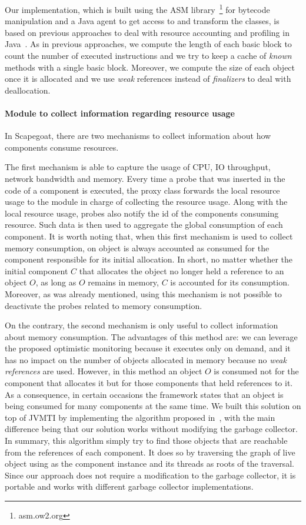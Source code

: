 Our implementation, which is built using the ASM library~\footnote{asm.ow2.org} for bytecode manipulation and a Java agent to get access to and transform the classes, is based on previous approaches to deal with resource accounting and profiling in Java~\cite{binder_portable_2006,Binder200645,czajkowski_jres:_1998}.
As in previous approaches, we compute the length of each basic block to count the number of executed instructions and we try to keep a cache of \textit{known} methods with a single basic block.
Moreover, we compute the size of each object once it is allocated and we use \textit{weak} references instead of \textit{finalizers} to deal with deallocation.

\paragraph{Module to collect information regarding resource usage}
In Scapegoat, there are two mechanisms to collect information about how components consume resources.

The first mechanism is able to capture the usage of CPU, IO throughput, network bandwidth and memory.
Every time a probe that was inserted in the code of a component is executed, the proxy class forwards the local resource usage to the module in charge of collecting the resource usage.
Along with the local resource usage, probes also notify the id of the components consuming resource.
Such data is then used to aggregate the global consumption of each component.
It is worth noting that, when this first mechanism is used to collect memory consumption, on object is always accounted as  consumed for the component responsible for its initial allocation.
In short, no matter whether the initial component $C$ that allocates the object no longer held a reference to an object $O$, as long as $O$ remains in memory, $C$ is accounted for its consumption.
Moreover, as was already mentioned, using this mechanism is not possible to deactivate the probes related to memory consumption.

On the contrary, the second mechanism is only useful to collect information about memory consumption.
The advantages of this method are: we can leverage the proposed optimistic monitoring because it executes only on demand, and it has no impact on the number of objects allocated in memory because no \textit{weak references} are used.
However, in this method an object $O$ is consumed not for the component that allocates it but for those components that held references to it.
As a consequence, in certain occasions the framework states that an object is being consumed for many components at the same time. 
We built this solution on top of JVMTI by implementing the algorithm proposed in~\cite{Price:2003:GCM:829515.830545, dsn/09/geoffray/ijvm}, with the main difference being that our solution works without modifying the garbage collector.
In summary, this algorithm simply try to find those objects that are reachable from the references of each component.
It does so by traversing the graph of live object using as the component instance and its threads as roots of the traversal. 
Since our approach does not require a modification to the garbage collector, it is portable and works with different garbage collector implementations.

